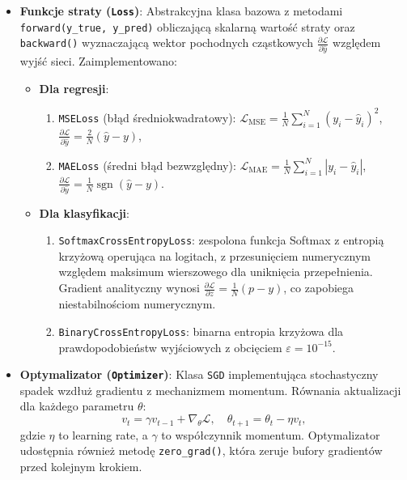 \documentclass[11pt,a4paper]{article}
\begin{document}
\begin{itemize}
    \item \textbf{Funkcje straty (\texttt{Loss})}:
    Abstrakcyjna klasa bazowa z metodami \texttt{forward(y\_true, y\_pred)} obliczającą skalarną wartość straty oraz \texttt{backward()} wyznaczającą wektor pochodnych cząstkowych $\frac{\partial \mathcal{L}}{\partial \hat{y}}$ względem wyjść sieci. Zaimplementowano:
    \begin{itemize}
        \item \textbf{Dla regresji}:
        \begin{enumerate}
            \item \texttt{MSELoss} (błąd średniokwadratowy): $\mathcal{L}_{\text{MSE}} = \frac{1}{N} \sum_{i=1}^N (y_i - \hat{y}_i)^2$, $\frac{\partial \mathcal{L}}{\partial \hat{y}} = \frac{2}{N}(\hat{y} - y)$,
            \item \texttt{MAELoss} (średni błąd bezwzględny): $\mathcal{L}_{\text{MAE}} = \frac{1}{N} \sum_{i=1}^N |y_i - \hat{y}_i|$, $\frac{\partial \mathcal{L}}{\partial \hat{y}} = \frac{1}{N} \operatorname{sgn}(\hat{y} - y)$.
        \end{enumerate}
        \item \textbf{Dla klasyfikacji}:
        \begin{enumerate}
            \item \texttt{SoftmaxCrossEntropyLoss}: zespolona funkcja Softmax z entropią krzyżową operująca na logitach, z przesunięciem numerycznym względem maksimum wierszowego dla uniknięcia przepełnienia. Gradient analityczny wynosi $\frac{\partial \mathcal{L}}{\partial z} = \frac{1}{N}(p - y)$, co zapobiega niestabilnościom numerycznym.
            \item \texttt{BinaryCrossEntropyLoss}: binarna entropia krzyżowa dla prawdopodobieństw wyjściowych z obcięciem $\varepsilon = 10^{-15}$.
        \end{enumerate}
    \end{itemize}

    \item \textbf{Optymalizator (\texttt{Optimizer})}:
    Klasa \texttt{SGD} implementująca stochastyczny spadek wzdłuż gradientu z mechanizmem momentum. Równania aktualizacji dla każdego parametru $\theta$:
    \begin{equation}
        v_t = \gamma v_{t-1} + \nabla_\theta \mathcal{L}, \quad \theta_{t+1} = \theta_t - \eta v_t,
    \end{equation}
    gdzie $\eta$ to learning rate, a $\gamma$ to współczynnik momentum. Optymalizator udostępnia również metodę \texttt{zero\_grad()}, która zeruje bufory gradientów przed kolejnym krokiem.


\end{itemize}
\end{document}

